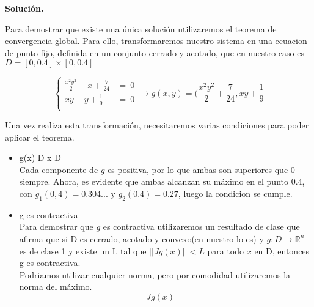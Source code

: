 \documentclass[11pt]{article}
\begin{document}
\textbf{Solución.}

Para demostrar que existe una única solución utilizaremos el teorema de
convergencia global. Para ello, transformaremos nuestro sistema en una ecuacion
de punto fijo, definida en un conjunto cerrado y acotado, que en nuestro caso
es $D = [0,0.4]\times[0,0.4]$

$$\begin{cases}
\frac{x^2y^2}{2} - x + \frac{7}{24} &= \ 0 \\
xy - y + \frac{1}{9} &= \ 0\\
\end{cases} \longrightarrow g(x,y) = (\frac{x^2y^2}{2} + \frac{7}{24}, xy +
\frac{1}{9} $$

Una vez realiza esta transformación, necesitaremos varias condiciones para poder
aplicar el teorema.
\begin{itemize}
        \item g(x) \in D \forall x \in D\\
        Cada componente de $g$ es positiva, por lo que ambas son superiores que
        $0$ siempre. Ahora, es evidente que ambas alcanzan su máximo en el punto
        $0.4$, con $g_1(0,4) = 0.304...$ y $g_2(0.4) = 0.27$, luego la condicion
        se cumple.
        \item g es contractiva\\
        Para demostrar que $g$ es contractiva utilizaremos un resultado de clase
        que afirma que si D es cerrado, acotado y convexo(en nuestro lo es) y
        $g:D \rightarrow \mathbb{R}^n$ es de clase 1 y existe un L tal que
        $||Jg(x)|| < L$ para todo $x$ en D, entonces g es contractiva.\\
        Podriamos utilizar cualquier norma, pero por comodidad utilizaremos la
        norma del máximo.
        $$Jg(x) =
        $$
\end{itemize}
\end{document}

